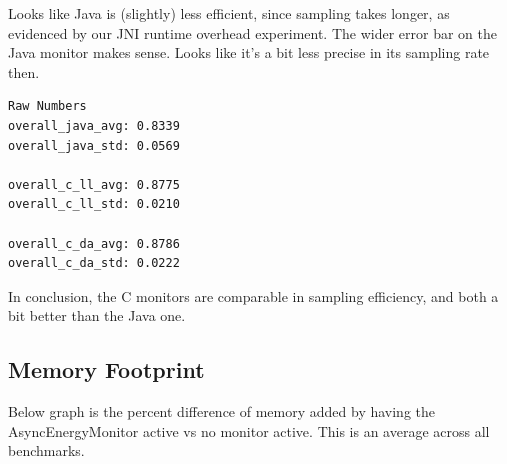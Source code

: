 Looks like Java is (slightly) less efficient, since sampling takes longer, as evidenced by
our JNI runtime overhead experiment. The wider error bar on the Java monitor makes sense. Looks
like it's a bit less precise in its sampling rate then.

\begin{verbatim} 
Raw Numbers
overall_java_avg: 0.8339
overall_java_std: 0.0569

overall_c_ll_avg: 0.8775
overall_c_ll_std: 0.0210

overall_c_da_avg: 0.8786
overall_c_da_std: 0.0222
\end{verbatim} %

In conclusion, the C monitors are comparable in sampling efficiency, and both a bit better than
the Java one.

\subsection{Memory Footprint}

Below graph is the percent difference of memory added by having the AsyncEnergyMonitor active vs no monitor active. This is an average across all benchmarks.

